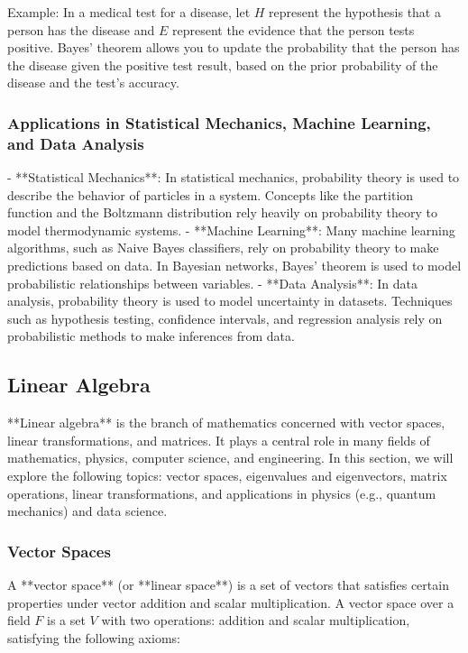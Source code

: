 \documentclass{article}
\begin{document}
Example: In a medical test for a disease, let \( H \) represent the hypothesis that a person has the disease and \( E \) represent the evidence that the person tests positive. Bayes' theorem allows you to update the probability that the person has the disease given the positive test result, based on the prior probability of the disease and the test's accuracy.

\subsubsection*{Applications in Statistical Mechanics, Machine Learning, and Data Analysis}

- **Statistical Mechanics**: In statistical mechanics, probability theory is used to describe the behavior of particles in a system. Concepts like the partition function and the Boltzmann distribution rely heavily on probability theory to model thermodynamic systems.
- **Machine Learning**: Many machine learning algorithms, such as Naive Bayes classifiers, rely on probability theory to make predictions based on data. In Bayesian networks, Bayes' theorem is used to model probabilistic relationships between variables.
- **Data Analysis**: In data analysis, probability theory is used to model uncertainty in datasets. Techniques such as hypothesis testing, confidence intervals, and regression analysis rely on probabilistic methods to make inferences from data.

\subsection{Linear Algebra}

**Linear algebra** is the branch of mathematics concerned with vector spaces, linear transformations, and matrices. It plays a central role in many fields of mathematics, physics, computer science, and engineering. In this section, we will explore the following topics: vector spaces, eigenvalues and eigenvectors, matrix operations, linear transformations, and applications in physics (e.g., quantum mechanics) and data science.

\subsubsection*{Vector Spaces}

A **vector space** (or **linear space**) is a set of vectors that satisfies certain properties under vector addition and scalar multiplication. A vector space over a field \( F \) is a set \( V \) with two operations: addition and scalar multiplication, satisfying the following axioms:
\end{document}
